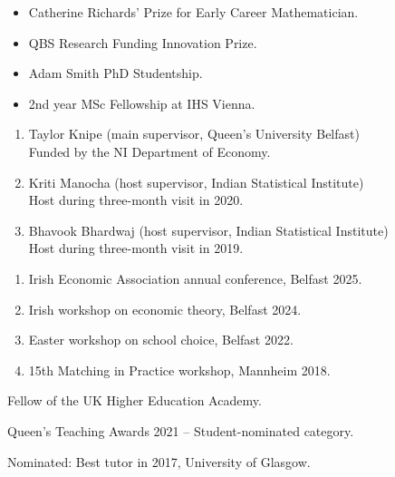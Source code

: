 \documentclass[11pt,a4paper]{article}
\begin{document}
\begin{itemize}[leftmargin=*,noitemsep,partopsep=0pt,topsep=0pt,parsep=0pt]
	\item Catherine Richards' Prize for Early Career Mathematician.
	\item QBS Research Funding Innovation Prize.
	\item 	Adam Smith PhD Studentship.
	\item 2nd year MSc Fellowship at IHS Vienna.	
\end{itemize}



\begin{enumerate}[leftmargin=*,noitemsep,partopsep=0pt,topsep=0pt,parsep=0pt,reversed]
	\item {Taylor Knipe} (main supervisor, Queen's University Belfast)\\
	Funded by the NI Department of Economy.
	
	\item {Kriti Manocha} (host supervisor, Indian Statistical Institute)\\
	Host during three-month visit in 2020. 
	
	\item {Bhavook Bhardwaj} (host supervisor, Indian Statistical Institute)\\
	Host during three-month visit in 2019. 
\end{enumerate}


\begin{enumerate}[leftmargin=*,noitemsep,partopsep=0pt,topsep=0pt,parsep=0pt,reversed]
	\item Irish Economic Association annual conference, Belfast 2025.
	\item Irish workshop on economic theory, Belfast 2024.
	\item Easter workshop on school choice, Belfast 2022.
	\item 15th Matching in Practice workshop, Mannheim 2018.
\end{enumerate}


\noindent Fellow of the UK Higher Education Academy.

\noindent Queen's Teaching Awards 2021 – Student-nominated category.

\noindent Nominated: Best tutor in 2017, University of Glasgow.\\
\end{document}
